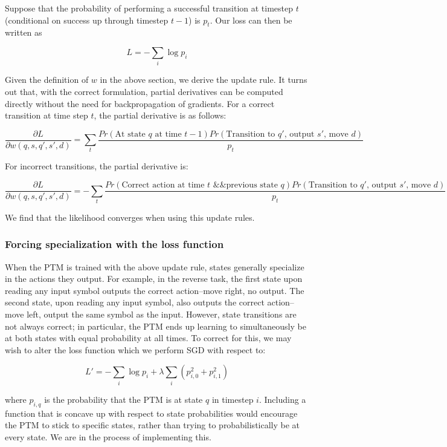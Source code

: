 \documentclass{article}
\begin{document}
Suppose that the probability of performing a successful transition at timestep $t$ (conditional on success up through timestep $t-1$) is $p_t$. Our loss can then be written as

\[ L = -\sum_i \log{p_i} \]

Given the definition of $w$ in the above section, we derive the update rule. It turns out that, with the correct formulation, partial derivatives can be computed directly without the need for backpropagation of gradients. For a correct transition at time step $t$, the partial derivative is as follows:

\[ \frac{\partial L}{\partial w(q, s, q', s', d)} = \sum_t \frac{Pr(\text{At state $q$ at time $t-1$})Pr(\text{Transition to $q'$, output $s'$, move $d$})}{p_t} \]

For incorrect transitions, the partial derivative is:

\[ \frac{\partial L}{\partial w(q, s, q', s', d)} = -\sum_t \frac{Pr(\text{Correct action at time $t$ \&\& previous state $q$})Pr(\text{Transition to $q'$, output $s'$, move $d$})}{p_t} \]

We find that the likelihood converges when using this update rules.

\subsubsection{Forcing specialization with the loss function}

When the PTM is trained with the above update rule, states generally specialize in the actions they output. For example, in the reverse task, the first state upon reading any input symbol outputs the correct action--move right, no output. The second state, upon reading any input symbol, also outputs the correct action--move left, output the same symbol as the input. However, state transitions are not always correct; in particular, the PTM ends up learning to simultaneously be at both states with equal probability at all times. To correct for this, we may wish to alter the loss function which we perform SGD with respect to:

\[ L' = -\sum_i \log{p_i} + \lambda\sum_i (p_{i,0}^2 + p_{i,1}^2) \]

where $p_{i,q}$ is the probability that the PTM is at state $q$ in timestep $i$. Including a function that is concave up with respect to state probabilities would encourage the PTM to stick to specific states, rather than trying to probabilistically be at every state. We are in the process of implementing this.
\end{document}
